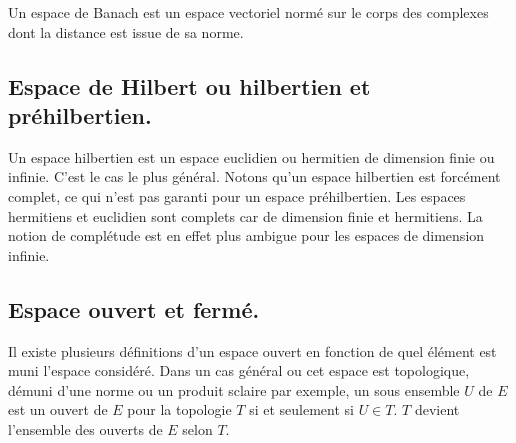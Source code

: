 \noindent Un espace de Banach est un espace vectoriel normé sur le corps des complexes dont la distance est issue de sa norme. \newline 

\subsection{Espace de Hilbert ou hilbertien et préhilbertien.} 

\noindent Un espace hilbertien est un espace euclidien ou hermitien de dimension finie ou infinie. C'est le cas le plus général. Notons qu'un espace hilbertien est forcément complet, ce qui n'est pas garanti pour un espace préhilbertien. Les espaces hermitiens et euclidien sont complets car de dimension finie et hermitiens. 
La notion de complétude est en effet plus ambigue pour les espaces de dimension infinie. \newline

\subsection{Espace ouvert et fermé.} 

\noindent Il existe plusieurs définitions d'un espace ouvert en fonction de quel élément est muni l'espace considéré. Dans un cas général ou cet espace est topologique, démuni d'une norme ou un produit sclaire par exemple, un sous ensemble $U$ de $E$ est un ouvert de $E$
pour la topologie $T$ si et seulement si $U \in T$. $T$ devient l'ensemble des ouverts de $E$ selon $T$.

\newpage

